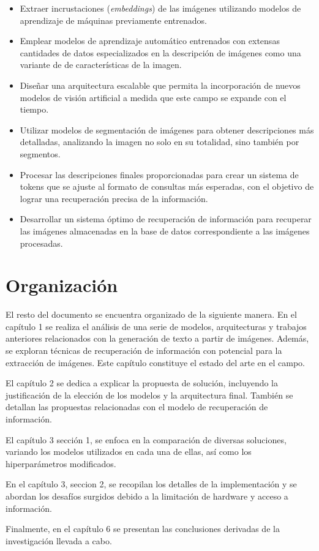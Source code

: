 \begin{itemize}
\item Extraer incrustaciones (\textit{embeddings}) de las im\'agenes utilizando modelos de aprendizaje de m\'aquinas previamente entrenados.
\item Emplear modelos de aprendizaje autom\'atico entrenados con extensas cantidades de datos especializados en la descripci\'on de im\'agenes como una variante de de caracter\'isticas de la imagen.
\item Dise\~nar una arquitectura escalable que permita la incorporaci\'on de nuevos modelos de visi\'on artificial a medida que este campo se expande con el tiempo.
\item Utilizar modelos de segmentaci\'on de im\'agenes para obtener descripciones m\'as detalladas, analizando la imagen no solo en su totalidad, sino tambi\'en por segmentos.
\item Procesar las descripciones finales proporcionadas para crear un sistema de tokens que se ajuste al formato de consultas m\'as esperadas, con el objetivo de lograr una recuperaci\'on precisa de la informaci\'on.
\item Desarrollar un sistema \'optimo de recuperaci\'on de informaci\'on para recuperar las im\'agenes almacenadas en la base de datos correspondiente a las im\'agenes procesadas.
\end{itemize}

\section{Organizaci\'on}
El resto del documento se encuentra organizado de la siguiente manera. En el cap\'itulo 1 se realiza el an\'alisis de una serie de modelos, arquitecturas y trabajos anteriores relacionados con la generaci\'on de texto a partir de im\'agenes. Adem\'as, se exploran t\'ecnicas de recuperaci\'on de informaci\'on con potencial para la extracci\'on de im\'agenes. Este cap\'itulo constituye el estado del arte en el campo.

El cap\'itulo 2 se dedica a explicar la propuesta de soluci\'on, incluyendo la justificaci\'on de la elecci\'on de los modelos y la arquitectura final. Tambi\'en se detallan las propuestas relacionadas con el modelo de recuperaci\'on de informaci\'on.

El cap\'itulo 3 secci\'on 1, se enfoca en la comparaci\'on de diversas soluciones, variando los modelos utilizados en cada una de ellas, as\'i como los hiperpar\'ametros modificados.

En el cap\'itulo 3, seccion 2, se recopilan los detalles de la implementaci\'on y se abordan los desaf\'ios surgidos debido a la limitaci\'on de hardware y acceso a informaci\'on.

Finalmente, en el cap\'itulo 6 se presentan las conclusiones derivadas de la investigaci\'on llevada a cabo.
